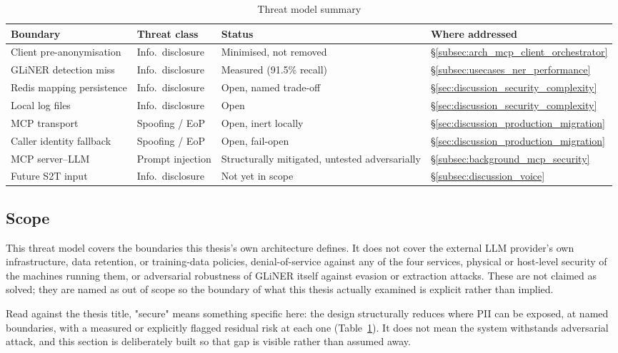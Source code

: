 \begin{table}[htbp]
\centering
\caption{Threat model summary}
\label{tab:threat_model}
\small
\begin{tabular}{p{3.2cm} p{2.6cm} p{2.6cm} p{4cm}}
\hline
\textbf{Boundary} & \textbf{Threat class} & \textbf{Status} & \textbf{Where addressed} \\
\hline
Client pre-anonymisation & Info.\ disclosure & Minimised, not removed & \S\ref{subsec:arch_mcp_client_orchestrator} \\
GLiNER detection miss & Info.\ disclosure & Measured (91.5\% recall) & \S\ref{subsec:usecases_ner_performance} \\
Redis mapping persistence & Info.\ disclosure & Open, named trade-off & \S\ref{sec:discussion_security_complexity} \\
Local log files & Info.\ disclosure & Open & \S\ref{sec:discussion_security_complexity} \\
MCP transport & Spoofing / EoP & Open, inert locally & \S\ref{sec:discussion_production_migration} \\
Caller identity fallback & Spoofing / EoP & Open, fail-open & \S\ref{sec:discussion_production_migration} \\
MCP server--LLM & Prompt injection & Structurally mitigated, untested adversarially & \S\ref{subsec:background_mcp_security} \\
Future S2T input & Info.\ disclosure & Not yet in scope & \S\ref{subsec:discussion_voice} \\
\hline
\end{tabular}
\end{table}

\subsection{Scope}
\label{subsec:discussion_threat_model_scope}

This threat model covers the boundaries this thesis's own architecture defines. It does not cover the external LLM provider's own infrastructure, data retention, or training-data policies, denial-of-service against any of the four services, physical or host-level security of the machines running them, or adversarial robustness of GLiNER itself against evasion or extraction attacks. These are not claimed as solved; they are named as out of scope so the boundary of what this thesis actually examined is explicit rather than implied.

Read against the thesis title, "secure" means something specific here: the design structurally reduces where PII can be exposed, at named boundaries, with a measured or explicitly flagged residual risk at each one (Table~\ref{tab:threat_model}). It does not mean the system withstands adversarial attack, and this section is deliberately built so that gap is visible rather than assumed away.

